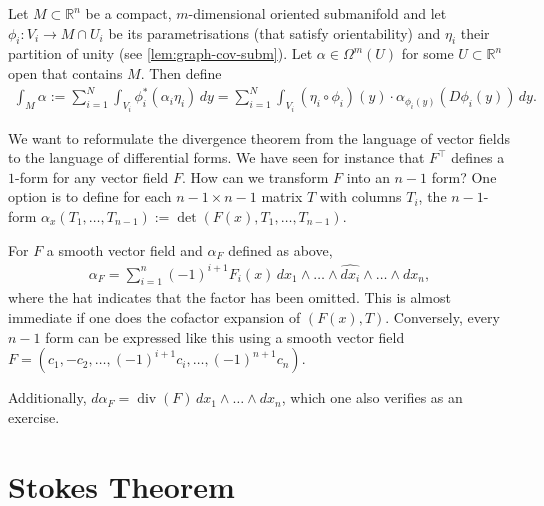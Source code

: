 \begin{definition}\label{def:int-form-comp-or-man}
	Let $M \subset \mathbb{R}^{n}$ be a compact, $m$-dimensional oriented submanifold and let $\phi_{i}: V_{i} \to M \cap U_{i}$ be its parametrisations (that satisfy orientability) and $\eta_{i}$ their partition of unity (see \ref{lem:graph-cov-subm}). Let $\alpha \in \Omega^{m}(U)$ for some $U \subset \mathbb{R}^{n}$ open that contains $M$. Then define
	\begin{align*}
		\int_{M} \alpha := \sum_{i=1}^{N} \int_{V_{i}} \phi_{i}^*(\alpha_{i} \eta_{i})\, dy = \sum_{i=1}^{N} \int_{V_{i}} (\eta_{i} \circ \phi_{i})(y) \cdot  \alpha_{\phi_{i}(y)}(D \phi_{i}(y)) \, dy.
	\end{align*}
\end{definition}

We want to reformulate the divergence theorem from the language of vector fields to the language of differential forms. We have seen for instance that $F^\top $ defines a $1$-form for any vector field $F$. How can we transform $F$ into an $n-1$ form? One option is to define for each $n-1 \times n-1$ matrix $T$ with columns $T_{i}$, the $n-1$-form $\alpha_{x}(T_{1}, \dots, T_{n-1}) := \det (F(x), T_{1}, \dots, T_{n-1}). $

\begin{remark}\label{rem:n1-forms-vecf}
	For $F$ a smooth vector field and $\alpha_{F}$ defined as above,
	\begin{align*}
		\alpha_{F} = \sum_{i=1}^{n} (-1)^{i+1} F_{i}(x) \, dx_{1} \wedge  \dots \wedge \widehat{dx_{i}} \wedge \dots \wedge dx_{n},
	\end{align*}
	where the hat indicates that the factor has been omitted. This is almost immediate if one does the cofactor expansion of $(F(x), T)$. Conversely, every $n-1$ form can be expressed like this using a smooth vector field $F = (c_{1}, -c_{2}, \dots, (-1)^{i+1} c_{i}, \dots, (-1)^{n+1} c_{n})$.

	Additionally, $d\alpha_{F} = \operatorname{div}(F) \, dx_{1} \wedge \dots \wedge dx_{n}$, which one also verifies as an exercise.
\end{remark}

\newpage

\section{Stokes Theorem}

